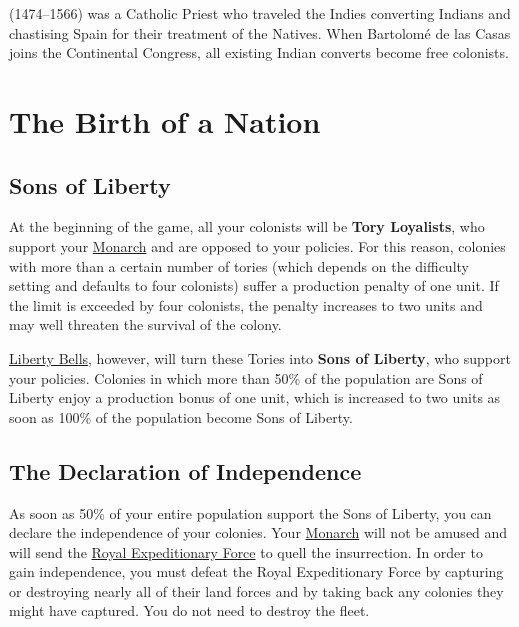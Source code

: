 \documentclass[12pt]{article}
\begin{document}
(1474--1566) was a Catholic Priest who traveled the Indies converting
Indians and chastising Spain for their treatment of the Natives. When
Bartolom\'e de las Casas joins the Continental Congress, all existing
Indian converts become free
colonists. 



\hypertarget{The Birth of a Nation}{\section{The Birth of a Nation}}

\hypertarget{Sons of Liberty}{\subsection{Sons of Liberty}}

At the beginning of the game, all your colonists will be
\hypertarget{Tories}{\textbf{Tory Loyalists}}, who support your
\hyperlink{Monarch}{Monarch} and are opposed to your policies. For
this reason, colonies with more than a certain number of tories (which
depends on the difficulty setting and defaults to four colonists)
suffer a production penalty of one unit. If the limit is exceeded by
four colonists, the penalty increases to two units and may well
threaten the survival of the colony.

\hyperlink{Liberty Bells}{Liberty Bells}, however, will turn these
Tories into \textbf{Sons of Liberty}, who support your
policies. Colonies in which more than 50\% of the population are Sons
of Liberty enjoy a production bonus of one unit, which is increased to
two units as soon as 100\% of the population become Sons of Liberty.


\hypertarget{Declaration of Independence}{\subsection{The Declaration
of Independence}}

As soon as 50\% of your entire population support the Sons of Liberty,
you can declare the independence of your colonies.  Your
\hyperlink{Monarch}{Monarch} will not be amused and will send the
\hyperlink{Royal Expeditionary Force}{Royal Expeditionary Force} to
quell the insurrection. In order to gain independence, you must defeat
the Royal Expeditionary Force by capturing or destroying nearly all of
their land forces and by taking back any colonies they might have
captured. You do not need to destroy the fleet.
\end{document}
